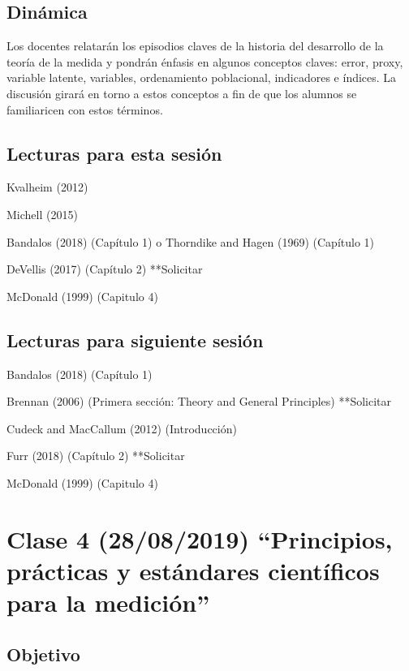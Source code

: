 \documentclass[11pt,]{article}
\begin{document}
\hypertarget{dinamica-2}{%
\subsection{Dinámica}\label{dinamica-2}}

Los docentes relatarán los episodios claves de la historia del
desarrollo de la teoría de la medida y pondrán énfasis en algunos
conceptos claves: error, proxy, variable latente, variables,
ordenamiento poblacional, indicadores e índices. La discusión girará en
torno a estos conceptos a fin de que los alumnos se familiaricen con
estos términos.

\hypertarget{lecturas-para-esta-sesion-1}{%
\subsection{Lecturas para esta
sesión}\label{lecturas-para-esta-sesion-1}}

Kvalheim (2012)

Michell (2015)

Bandalos (2018) (Capítulo 1) o Thorndike and Hagen (1969) (Capítulo 1)

DeVellis (2017) (Capítulo 2) **Solicitar

McDonald (1999) (Capitulo 4)

\hypertarget{lecturas-para-siguiente-sesion-1}{%
\subsection{Lecturas para siguiente
sesión}\label{lecturas-para-siguiente-sesion-1}}

Bandalos (2018) (Capítulo 1)

Brennan (2006) (Primera sección: Theory and General Principles)
**Solicitar

Cudeck and MacCallum (2012) (Introducción)

Furr (2018) (Capítulo 2) **Solicitar

McDonald (1999) (Capitulo 4)

\hypertarget{clase-4-28082019-principios-practicas-y-estandares-cientificos-para-la-medicion}{%
\section{Clase 4 (28/08/2019) ``Principios, prácticas y estándares
científicos para la
medición''}\label{clase-4-28082019-principios-practicas-y-estandares-cientificos-para-la-medicion}}

\hypertarget{objetivo-3}{%
\subsection{Objetivo}\label{objetivo-3}}
\end{document}
